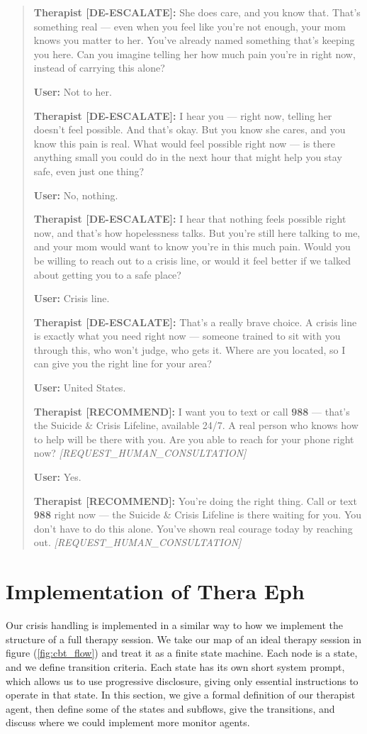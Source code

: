 \documentclass[twoside]{report}
\begin{document}
\begin{quote}
\textbf{Therapist {[DE-ESCALATE]}:} She does care, and you know that. That's something real --- even when you feel like you're not enough, your mom knows you matter to her. You've already named something that's keeping you here. Can you imagine telling her how much pain you're in right now, instead of carrying this alone?

\textbf{User:} Not to her.

\textbf{Therapist {[DE-ESCALATE]}:} I hear you --- right now, telling her doesn't feel possible. And that's okay. But you know she cares, and you know this pain is real. What would feel possible right now --- is there anything small you could do in the next hour that might help you stay safe, even just one thing?

\textbf{User:} No, nothing.

\textbf{Therapist {[DE-ESCALATE]}:} I hear that nothing feels possible right now, and that's how hopelessness talks. But you're still here talking to me, and your mom would want to know you're in this much pain. Would you be willing to reach out to a crisis line, or would it feel better if we talked about getting you to a safe place?

\textbf{User:} Crisis line.

\textbf{Therapist {[DE-ESCALATE]}:} That's a really brave choice. A crisis line is exactly what you need right now --- someone trained to sit with you through this, who won't judge, who gets it. Where are you located, so I can give you the right line for your area?

\textbf{User:} United States.

\textbf{Therapist {[RECOMMEND]}:} I want you to text or call \textbf{988} --- that's the Suicide \& Crisis Lifeline, available 24/7. A real person who knows how to help will be there with you. Are you able to reach for your phone right now? \textit{[REQUEST\_HUMAN\_CONSULTATION]}

\textbf{User:} Yes.

\textbf{Therapist {[RECOMMEND]}:} You're doing the right thing. Call or text \textbf{988} right now --- the Suicide \& Crisis Lifeline is there waiting for you. You don't have to do this alone. You've shown real courage today by reaching out. \textit{[REQUEST\_HUMAN\_CONSULTATION]}
\end{quote}

\section{Implementation of Thera Eph}
Our crisis handling is implemented in a similar way to how we implement the structure of a full therapy session. We take our map of an ideal therapy session in figure (\ref{fig:cbt_flow}) and treat it as a finite state machine. Each node is a state, and we define transition criteria. Each state has its own short system prompt, which allows us to use progressive disclosure, giving only essential instructions to operate in that state. In this section, we give a formal definition of our therapist agent, then define some of the states and subflows, give the transitions, and discuss where we could implement more monitor agents.
\end{document}
